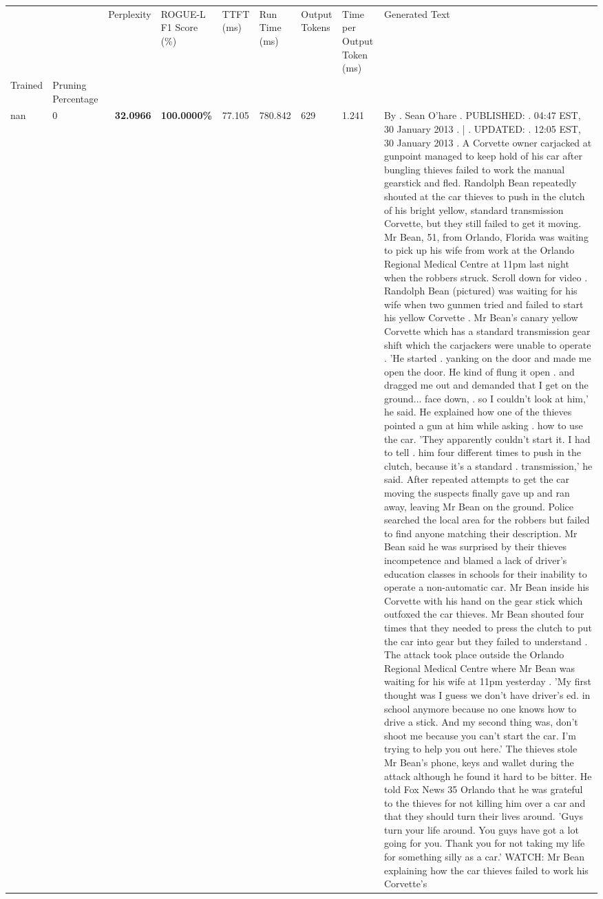 \begin{table}[H]
\label{tab:evaluation-pipeline-1}
\begin{tabular}{|m{}| m{}| r | R{0.13\textwidth}| R{0.09\textwidth}| R{0.09\textwidth}| R{0.09\textwidth}| R{0.11\textwidth}|}
\toprule
 &  & Perplexity & ROGUE-L F1 Score (\%) & TTFT (ms) & Run Time (ms) & Output Tokens & Time per Output Token (ms) & Generated Text \\
Trained & Pruning Percentage &  &  &  &  &  &  &  \\
\midrule
nan & 0 & \bfseries 32.0966 & \bfseries 100.0000\% & 77.105 & 780.842 & 629 & 1.241 & By . Sean O'hare . PUBLISHED: . 04:47 EST, 30 January 2013 . | . UPDATED: . 12:05 EST, 30 January 2013 . A Corvette owner carjacked at gunpoint managed to keep hold of his car after bungling thieves failed to work the manual gearstick and fled. Randolph Bean repeatedly shouted at the car thieves to push in the clutch of his bright yellow, standard transmission Corvette, but they still failed to get it moving. Mr Bean, 51, from Orlando, Florida was waiting to pick up his wife from work at the Orlando Regional Medical Centre at 11pm last night when the robbers struck. Scroll down for video . Randolph Bean (pictured) was waiting for his wife when two gunmen tried and failed to start his yellow Corvette . Mr Bean's canary yellow Corvette which has a standard transmission gear shift which the carjackers were unable to operate . 'He started . yanking on the door and made me open the door. He kind of flung it open . and dragged me out and demanded that I get on the ground... face down, . so I couldn't look at him,' he said. He explained how one of the thieves pointed a gun at him while asking . how to use the car. 'They apparently couldn't start it. I had to tell . him four different times to push in the clutch, because it's a standard . transmission,' he said. After repeated attempts to get the car moving the suspects finally gave up and ran away, leaving Mr Bean on the ground. Police searched the local area for the robbers but failed to find anyone matching their description. Mr Bean said he was surprised by their thieves incompetence and blamed a lack of driver's education classes in schools for their inability to operate a non-automatic car. Mr Bean inside his Corvette with his hand on the gear stick which outfoxed the car thieves. Mr Bean shouted four times that they needed to press the clutch to put the car into gear but they failed to understand . The attack took place outside the Orlando Regional Medical Centre where Mr Bean was waiting for his wife at 11pm yesterday . 'My first thought was I guess we don't have driver's ed. in school anymore because no one knows how to drive a stick. And my second thing was, don't shoot me because you can't start the car. I'm trying to help you out here.' The thieves stole Mr Bean's phone, keys and wallet during the attack although he found it hard to be bitter. He told Fox News 35 Orlando that he was grateful to the thieves for not killing him over a car and that they should turn their lives around. 'Guys turn your life around. You guys have got a lot going for you. Thank you for not taking my life for something silly as a car.' WATCH: Mr Bean explaining how the car thieves failed to work his Corvette's 
\end{tabular}
\end{table}
